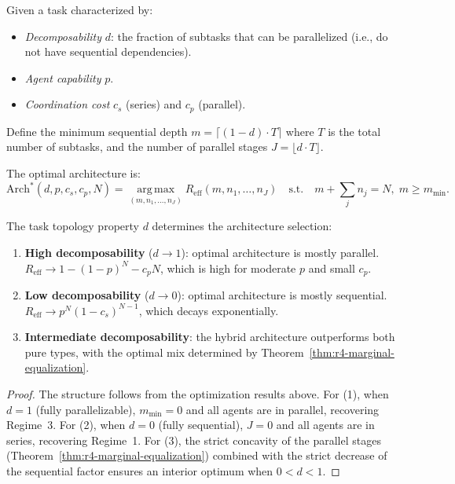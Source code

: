 \begin{theorem}
\label{thm:r4-architecture-selection}
Given a task characterized by:
\begin{itemize}
  \item \emph{Decomposability} $d$: the fraction of subtasks that can be
    parallelized (i.e., do not have sequential dependencies).
  \item \emph{Agent capability} $p$.
  \item \emph{Coordination cost} $c_s$ (series) and $c_p$ (parallel).
\end{itemize}
Define the minimum sequential depth $m = \lceil (1-d) \cdot T \rceil$ where
$T$ is the total number of subtasks, and the number of parallel stages
$J = \lfloor d \cdot T \rfloor$.

The optimal architecture is:
\[
  \mathrm{Arch}^*(d, p, c_s, c_p, N) = \operatorname*{arg\,max}_{(m, n_1, \ldots, n_J)}
  R_{\mathrm{eff}}(m, n_1, \ldots, n_J)
  \quad\text{s.t.}\quad m + \sum_j n_j = N,\; m \ge m_{\min}.
\]

The task topology property $d$ determines the architecture selection:
\begin{enumerate}
  \item \textbf{High decomposability} ($d \to 1$): optimal architecture is
    mostly parallel.  $R_{\mathrm{eff}} \to 1 - (1-p)^N - c_p N$, which is
    high for moderate $p$ and small $c_p$.
  \item \textbf{Low decomposability} ($d \to 0$): optimal architecture is
    mostly sequential.  $R_{\mathrm{eff}} \to p^N (1-c_s)^{N-1}$, which
    decays exponentially.
  \item \textbf{Intermediate decomposability}: the hybrid architecture
    outperforms both pure types, with the optimal mix determined by
    Theorem~\ref{thm:r4-marginal-equalization}.
\end{enumerate}
\end{theorem}

\begin{proof}
The structure follows from the optimization results above.  For (1), when
$d = 1$ (fully parallelizable), $m_{\min} = 0$ and all agents are in parallel,
recovering Regime~3.  For (2), when $d = 0$ (fully sequential), $J = 0$ and
all agents are in series, recovering Regime~1.  For (3), the strict concavity
of the parallel stages (Theorem~\ref{thm:r4-marginal-equalization}) combined
with the strict decrease of the sequential factor ensures an interior optimum
when $0 < d < 1$.
\end{proof}


